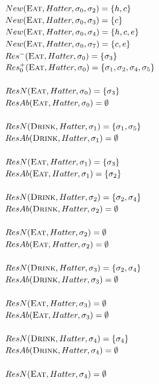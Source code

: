 \documentclass{article}
\begin{document}
$New(\textsc{Eat},Hatter,\sigma_{0},\sigma_{2})=\{h, c\}$\\
$New(\textsc{Eat},Hatter,\sigma_{0},\sigma_{3})=\{c\}$\\
$New(\textsc{Eat},Hatter,\sigma_{0},\sigma_{4})=\{h, c, e\}$\\
$New(\textsc{Eat},Hatter,\sigma_{0},\sigma_{7})=\{c, e\}$\\
$Res^{-}(\textsc{Eat},Hatter,\sigma_{0})=\{\sigma_{3}\}$\\
$Res_{0}^{+}(\textsc{Eat},Hatter,\sigma_{0})=\{\sigma_{1}, \sigma_{2}, \sigma_{4}, \sigma_{5}\}$\\\\
$ResN(\textsc{Eat},Hatter,\sigma_{0})=\{\sigma_{3}\}$\\
$ResAb(\textsc{Eat},Hatter,\sigma_{0})=\emptyset$\\\\
$ResN(\textsc{Drink},Hatter,\sigma_{1})=\{\sigma_{1}, \sigma_{5}\}$\\
$ResAb(\textsc{Drink},Hatter,\sigma_{1})=\emptyset$\\\\
$ResN(\textsc{Eat},Hatter,\sigma_{1})=\{\sigma_{3}\}$\\
$ResAb(\textsc{Eat},Hatter,\sigma_{1})=\{\sigma_{2}\}$\\\\
$ResN(\textsc{Drink},Hatter,\sigma_{2})=\{\sigma_{2}, \sigma_{4}\}$\\
$ResAb(\textsc{Drink},Hatter,\sigma_{2})=\emptyset$\\\\
$ResN(\textsc{Eat},Hatter,\sigma_{2})=\emptyset$\\
$ResAb(\textsc{Eat},Hatter,\sigma_{2})=\emptyset$\\\\
$ResN(\textsc{Drink},Hatter,\sigma_{3})=\{\sigma_{2}, \sigma_{4}\}$\\
$ResAb(\textsc{Drink},Hatter,\sigma_{3})=\emptyset$\\\\
$ResN(\textsc{Eat},Hatter,\sigma_{3})=\emptyset$\\
$ResAb(\textsc{Eat},Hatter,\sigma_{3})=\emptyset$\\\\
$ResN(\textsc{Drink},Hatter,\sigma_{4})=\{\sigma_{4}\}$\\
$ResAb(\textsc{Drink},Hatter,\sigma_{4})=\emptyset$\\\\
$ResN(\textsc{Eat},Hatter,\sigma_{4})=\emptyset$\\
\end{document}

